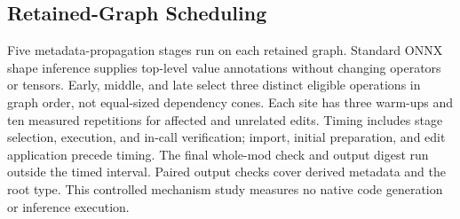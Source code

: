\clearpage
\subsection{Retained-Graph Scheduling}
Five metadata-propagation stages run on each retained graph. Standard ONNX
shape inference supplies top-level value annotations without changing
operators or tensors. Early, middle, and late select three distinct eligible
operations in graph order, not equal-sized dependency cones. Each site has
three warm-ups and ten measured repetitions for affected and unrelated edits.
Timing includes stage selection, execution, and in-call verification; import,
initial preparation, and edit application precede timing. The final whole-mod
check and output digest run outside the timed interval. Paired output checks cover
derived metadata and the root type. This controlled mechanism study measures
no native code generation or inference execution.

